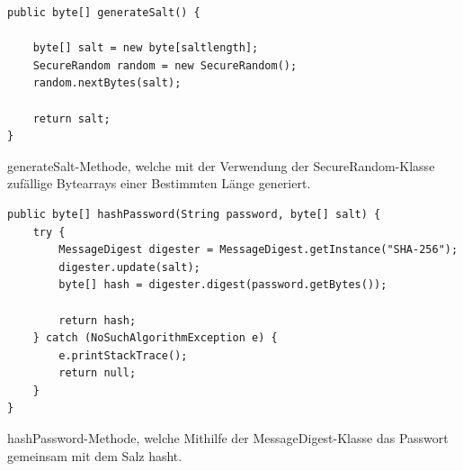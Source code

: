 \documentclass[a4paper,11pt]{report}
\newenvironment{code}{\captionsetup{type=figure}}{}
\begin{document}
\begin{code}
	\begin{center}
		\begin{verbatim}
public byte[] generateSalt() {

	byte[] salt = new byte[saltlength];
	SecureRandom random = new SecureRandom();
	random.nextBytes(salt);

	return salt;
}							
		\end{verbatim}
	\caption{generateSalt-Methode, welche mit der Verwendung der SecureRandom-Klasse zufällige Bytearrays einer Bestimmten Länge generiert.}\label{java:generateSalt}
	\end{center}
\end{code}
			
			
\begin{code}
	\begin{center}
		\begin{verbatim}
public byte[] hashPassword(String password, byte[] salt) {
	try {
		MessageDigest digester = MessageDigest.getInstance("SHA-256");
		digester.update(salt);
		byte[] hash = digester.digest(password.getBytes());
					
		return hash;
	} catch (NoSuchAlgorithmException e) {
		e.printStackTrace();
		return null;
	}
}
	\end{verbatim}
	\caption{hashPassword-Methode, welche Mithilfe der MessageDigest-Klasse das Passwort gemeinsam mit dem Salz hasht.}\label{java:hashPassword}
	\end{center}
\end{code}
\end{document}
